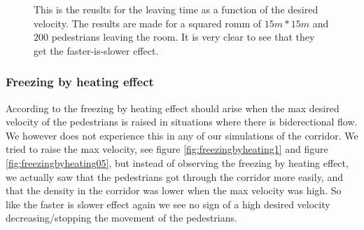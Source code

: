 \begin{figure}[h]
\centering
{}
\caption{This is the reuslts for the leaving time as a function of the desired 
velocity. The results are made for a squared romm of $15m*15m$ and $200$ 
pedestrians leaving the room. It is very clear to see that they get the 
faster-is-slower effect.}
\label{fig:LtNFasterIsSlower}
\end{figure}



\subsubsection{Freezing by heating effect}
According to \cite{self-org} the freezing by heating effect should
arise when the max desired velocity of the pedestrians is raised in
situations where there is biderectional flow. We however does not
experience this in any of our simulations of the corridor. We tried
to raise the max velocity, see figure \ref{fig:freezingbyheating1} and
figure \ref{fig:freezingbyheating05}, but instead of observing the
freezing by heating effect, we actually saw that the pedestrians got
through the corridor more easily, and that the density in the corridor
was lower when the max velocity was high. So like the faster is slower
effect again we see no sign of a high desired velocity decreasing/stopping
the movement of the pedestrians.

